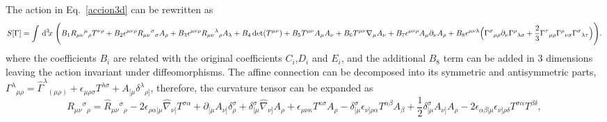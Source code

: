 \documentclass[%
  showpacs,showkeys,prd,superscriptaddress]{revtex4-1}
\begin{document}
The action in Eq.~\eqref{accion3d} can be rewritten as
\begin{dmath}[compact, spread=2pt]
  \label{accion3dnew}
  S[\Gamma]=\int\dn{3}{x} \Bigg( 
  B_1R_{\mu\nu}{}^\mu{}_{\rho} T^{\nu\rho} 
  +B_2\epsilon^{\mu\nu\rho}R_{\mu\nu}{}^{\sigma}{}_\sigma A_\rho 
  +B_3 \epsilon^{\mu\nu\rho}R_{\mu\nu}{}^\lambda{}_\rho A_\lambda 
  +B_4 \det(T^{\mu\nu}) 
  +B_5 T^{\mu\nu}A_\mu A_\nu 
  +B_6 T^{\mu\nu}\nabla_\mu A_\nu
  +B_7\epsilon^{\mu\nu\rho}A_\mu\partial_\nu A_\rho
  +B_8\epsilon^{\mu\nu\lambda}\Big(\Gamma^{\sigma}{}_{\mu\rho}\partial_\nu\Gamma^{\rho}{}_{\lambda\sigma}
  +\frac{2}{3}\Gamma^{\tau}{}_{\mu\rho}\Gamma^{\rho}{}_{\nu\sigma}\Gamma^{\sigma}{}_{\lambda\tau}{}\Big)\Bigg).
\end{dmath}
where the coefficients $B_i$ are related with the original coefficients $C_i$,$D_i$ and $E_i$, and the additional $B_8$ term can be added in 3 dimensions leaving the action invariant under diffeomorphisms. %
The affine connection can be decomposed into its symmetric and antisymmetric parts, \mbox{$\Gamma^\lambda{}_{\mu\rho}=\hat\Gamma^\lambda{}_{(\mu\rho)} + \epsilon_{\mu\rho\sigma}T^{\lambda\sigma} + A_{[\mu}\delta^\lambda{}_{\rho]}$,} therefore, the curvature tensor can be expanded as 
\begin{dmath}[compact, spread=2pt]
  \label{RiemmanDecomposition}
  R_{\mu\nu}{}^\sigma{}_\rho=
  \hat{R}_{\mu\nu}{}^\sigma{}_\rho
  -2\epsilon_{\rho\alpha[\mu}\hat\nabla_{\nu]}T^{\sigma\alpha}
  +\partial_{[\mu}A_{\nu]}\delta^\sigma_\rho
  +\delta^\sigma_{[\mu}\hat\nabla_{\nu]}A_\rho
  +\epsilon_{\mu\nu\kappa}T^{\kappa\sigma}A_\rho
  -\delta^\sigma_{[\mu}\epsilon_{\nu]\rho\alpha}T^{\alpha\beta}A_\beta 
  +\frac{1}{2}\delta^\sigma_{[\mu}A_{\nu]}A_\rho
  -2\epsilon_{\alpha\beta[\mu}\epsilon_{\nu]\rho\delta}T^{\sigma\alpha}T^{\beta\delta},
\end{dmath}
\end{document}
